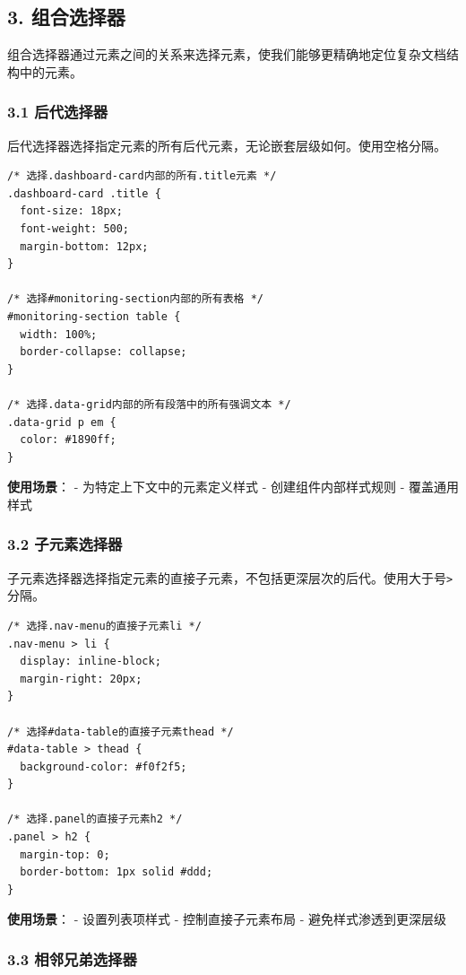 \subsection{3. 组合选择器}\label{ux7ec4ux5408ux9009ux62e9ux5668}

组合选择器通过元素之间的关系来选择元素，使我们能够更精确地定位复杂文档结构中的元素。

\subsubsection{3.1 后代选择器}\label{ux540eux4ee3ux9009ux62e9ux5668}

后代选择器选择指定元素的所有后代元素，无论嵌套层级如何。使用空格分隔。

\begin{lstlisting}
/* 选择.dashboard-card内部的所有.title元素 */
.dashboard-card .title {
  font-size: 18px;
  font-weight: 500;
  margin-bottom: 12px;
}

/* 选择#monitoring-section内部的所有表格 */
#monitoring-section table {
  width: 100%;
  border-collapse: collapse;
}

/* 选择.data-grid内部的所有段落中的所有强调文本 */
.data-grid p em {
  color: #1890ff;
}
\end{lstlisting}

\textbf{使用场景}： - 为特定上下文中的元素定义样式 -
创建组件内部样式规则 - 覆盖通用样式

\subsubsection{3.2
子元素选择器}\label{ux5b50ux5143ux7d20ux9009ux62e9ux5668}

子元素选择器选择指定元素的直接子元素，不包括更深层次的后代。使用大于号\passthrough{\lstinline!>!}分隔。

\begin{lstlisting}
/* 选择.nav-menu的直接子元素li */
.nav-menu > li {
  display: inline-block;
  margin-right: 20px;
}

/* 选择#data-table的直接子元素thead */
#data-table > thead {
  background-color: #f0f2f5;
}

/* 选择.panel的直接子元素h2 */
.panel > h2 {
  margin-top: 0;
  border-bottom: 1px solid #ddd;
}
\end{lstlisting}

\textbf{使用场景}： - 设置列表项样式 - 控制直接子元素布局 -
避免样式渗透到更深层级

\subsubsection{3.3
相邻兄弟选择器}\label{ux76f8ux90bbux5144ux5f1fux9009ux62e9ux5668}

